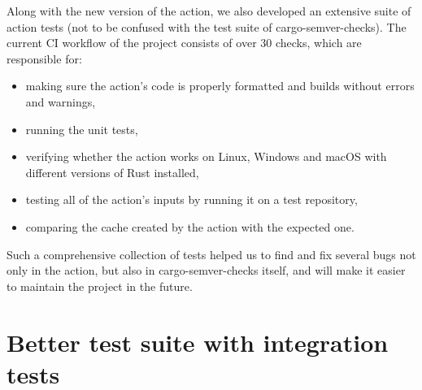 \documentclass[licencjacka,en]{pracamgr}
\begin{document}
Along with the new version of the action, we also developed an extensive suite of action tests
(not to be confused with the test suite of cargo-semver-checks). The current CI workflow
of the project consists of over 30 checks, which are responsible for:
\begin{itemize}
	\item making sure the action's code is properly formatted and builds without errors and warnings,
	\item running the unit tests,
	\item verifying whether the action works on Linux, Windows and macOS with different versions of
		Rust installed,
	\item testing all of the action's inputs by running it on a test repository,
	\item comparing the cache created by the action with the expected one.
\end{itemize}
Such a comprehensive collection of tests helped us to find and fix several bugs not only in the action,
but also in cargo-semver-checks itself, and will make it easier to maintain the project in the future.

\section{Better test suite with integration tests}\label{r:section_test_suite}
\end{document}
